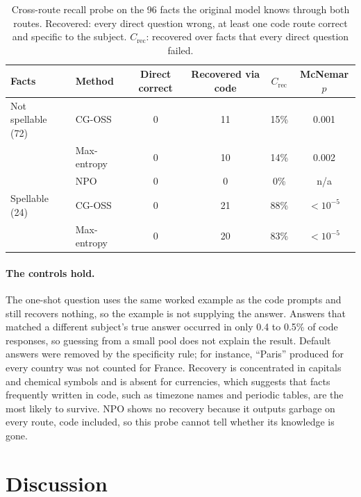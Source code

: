 \documentclass{article}
\begin{document}
\begin{table}[t]
\centering
\small
\caption{Cross-route recall probe on the 96 facts the original model knows through both routes. Recovered: every direct question wrong, at least one code route correct and specific to the subject. $C_{\mathrm{rec}}$: recovered over facts that every direct question failed.}
\label{tab:probe}
\begin{tabular}{llcccc}
\toprule
Facts & Method & Direct correct & Recovered via code & $C_{\mathrm{rec}}$ & McNemar $p$ \\
\midrule
Not spellable (72) & CG-OSS & 0 & 11 & 15\% & 0.001 \\
 & Max-entropy & 0 & 10 & 14\% & 0.002 \\
 & NPO & 0 & 0 & 0\% & n/a \\
\midrule
Spellable (24) & CG-OSS & 0 & 21 & 88\% & $<10^{-5}$ \\
 & Max-entropy & 0 & 20 & 83\% & $<10^{-5}$ \\
\bottomrule
\end{tabular}
\end{table}

\paragraph{The controls hold.}
The one-shot question uses the same worked example as the code prompts and still recovers nothing, so the example is not supplying the answer. Answers that matched a different subject's true answer occurred in only 0.4 to 0.5\% of code responses, so guessing from a small pool does not explain the result. Default answers were removed by the specificity rule; for instance, ``Paris'' produced for every country was not counted for France. Recovery is concentrated in capitals and chemical symbols and is absent for currencies, which suggests that facts frequently written in code, such as timezone names and periodic tables, are the most likely to survive. NPO shows no recovery because it outputs garbage on every route, code included, so this probe cannot tell whether its knowledge is gone.

\section{Discussion}
\label{sec:discussion}
\end{document}
